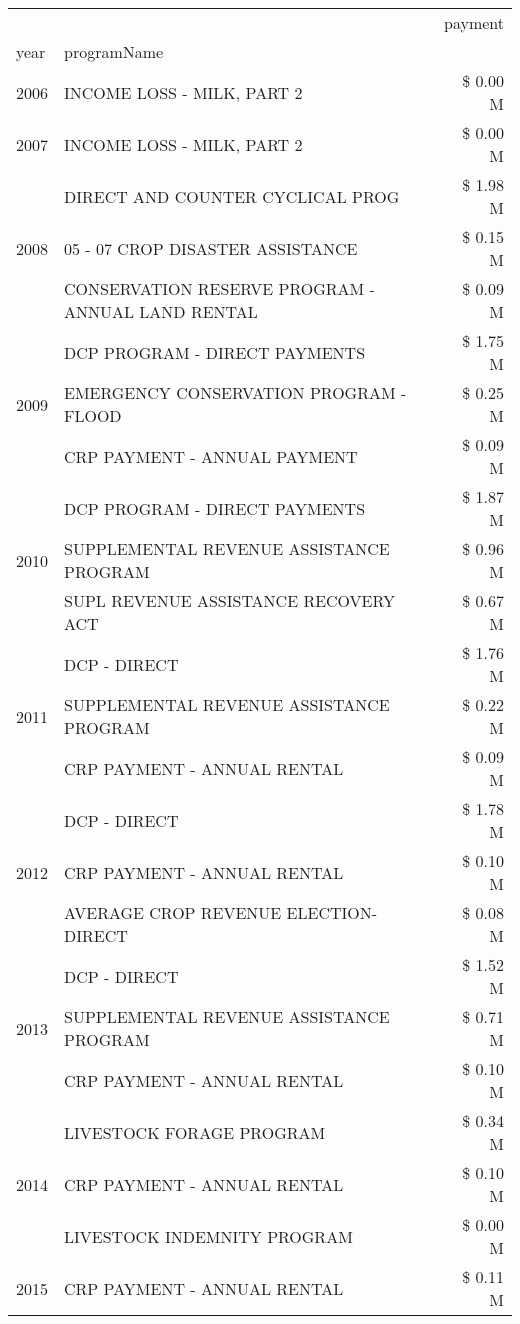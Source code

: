 \begin{tabular}{llr}
\toprule
 &  & payment \\
year & programName &  \\
\midrule
2006 & INCOME LOSS - MILK, PART 2 & \$ 0.00 M \\
\cline{1-3}
2007 & INCOME LOSS - MILK, PART 2 & \$ 0.00 M \\
\cline{1-3}
\multirow[t]{3}{*}{2008} & DIRECT AND COUNTER CYCLICAL PROG & \$ 1.98 M \\
 & 05 - 07 CROP DISASTER ASSISTANCE & \$ 0.15 M \\
 & CONSERVATION RESERVE PROGRAM - ANNUAL LAND RENTAL & \$ 0.09 M \\
\cline{1-3}
\multirow[t]{3}{*}{2009} & DCP PROGRAM - DIRECT PAYMENTS & \$ 1.75 M \\
 & EMERGENCY CONSERVATION PROGRAM - FLOOD & \$ 0.25 M \\
 & CRP PAYMENT - ANNUAL PAYMENT & \$ 0.09 M \\
\cline{1-3}
\multirow[t]{3}{*}{2010} & DCP PROGRAM - DIRECT PAYMENTS & \$ 1.87 M \\
 & SUPPLEMENTAL REVENUE ASSISTANCE PROGRAM & \$ 0.96 M \\
 & SUPL REVENUE ASSISTANCE RECOVERY ACT & \$ 0.67 M \\
\cline{1-3}
\multirow[t]{3}{*}{2011} & DCP - DIRECT & \$ 1.76 M \\
 & SUPPLEMENTAL REVENUE ASSISTANCE PROGRAM & \$ 0.22 M \\
 & CRP PAYMENT - ANNUAL RENTAL & \$ 0.09 M \\
\cline{1-3}
\multirow[t]{3}{*}{2012} & DCP - DIRECT & \$ 1.78 M \\
 & CRP PAYMENT - ANNUAL RENTAL & \$ 0.10 M \\
 & AVERAGE CROP REVENUE ELECTION-DIRECT & \$ 0.08 M \\
\cline{1-3}
\multirow[t]{3}{*}{2013} & DCP - DIRECT & \$ 1.52 M \\
 & SUPPLEMENTAL REVENUE ASSISTANCE PROGRAM & \$ 0.71 M \\
 & CRP PAYMENT - ANNUAL RENTAL & \$ 0.10 M \\
\cline{1-3}
\multirow[t]{3}{*}{2014} & LIVESTOCK FORAGE PROGRAM & \$ 0.34 M \\
 & CRP PAYMENT - ANNUAL RENTAL & \$ 0.10 M \\
 & LIVESTOCK INDEMNITY PROGRAM & \$ 0.00 M \\
\cline{1-3}
\multirow[t]{2}{*}{2015} & CRP PAYMENT - ANNUAL RENTAL & \$ 0.11 M \\

\end{tabular}
